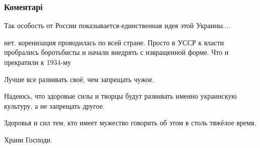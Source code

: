  
 
 
 
 
\subsubsection{Коментарі}
\label{sec:29_07_2021.fb.berdnik_miroslava.1.ukrainizacia_foto_sssr.cmt}

\begin{itemize}
 
Так особость от России показывается-единственная идея этой Украины....

\begin{itemize}
 
нет. коренизация проводилась по всей стране. Просто в УССР к власти пробрались
боротьбисты и начали внедрять с извращенной форме. Что и прекратили к 1934-му
\end{itemize}

 

Лучше все развивать своё, чем запрещать чужое. 

Надеюсь, что здоровые силы и
творцы будут развивать именно украинскую культуру, а не запрещать другое.

Здоровья и сил тем, кто имеет мужество говорить об этом в столь тяжёлое время.

Храни Господи.

\begin{itemize}
 

\end{itemize}
\end{itemize}
